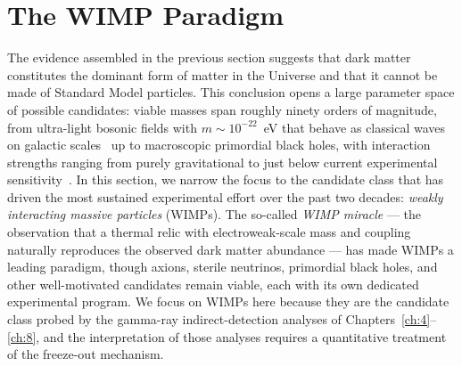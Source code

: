 
\section{The WIMP Paradigm}
\label{sec:1.2}

The evidence assembled in the previous section suggests that dark matter constitutes the dominant form of matter in the Universe and that it cannot be made of Standard Model particles.
This conclusion opens a large parameter space of possible candidates: viable masses span roughly ninety orders of magnitude, from ultra-light bosonic fields with $m \sim 10^{-22}$~eV that behave as classical waves on galactic scales~\cite{Hu:2000ke} up to macroscopic primordial black holes, with interaction strengths ranging from purely gravitational to just below current experimental sensitivity~\cite{Cirelli:2024ssz}.
In this section, we narrow the focus to the candidate class that has driven the most sustained experimental effort over the past two decades: \emph{weakly interacting massive particles} (WIMPs).
The so-called \emph{WIMP miracle} --- the observation that a thermal relic with electroweak-scale mass and coupling naturally reproduces the observed dark matter abundance --- has made WIMPs a leading paradigm, though axions, sterile neutrinos, primordial black holes, and other well-motivated candidates remain viable, each with its own dedicated experimental program.
We focus on WIMPs here because they are the candidate class probed by the gamma-ray indirect-detection analyses of Chapters~\ref{ch:4}--\ref{ch:8}, and the interpretation of those analyses requires a quantitative treatment of the freeze-out mechanism.

